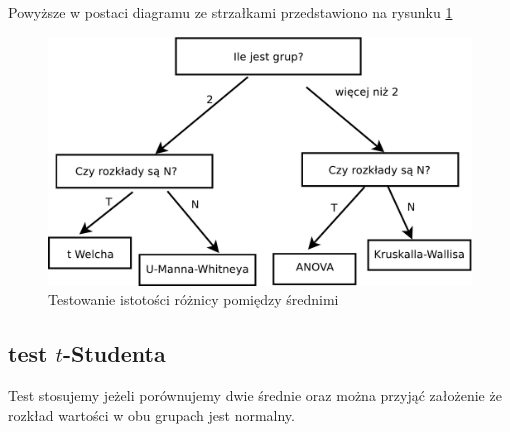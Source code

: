 \documentclass[
  openany]{book}
\begin{document}
Powyższe w postaci diagramu ze strzałkami przedstawiono na rysunku \ref{fig:testy}

\begin{figure}
\includegraphics[width=0.75\linewidth]{./TestFlowChart} \caption{Testowanie istotości różnicy pomiędzy średnimi}\label{fig:testy}
\end{figure}

\hypertarget{test-t-studenta}{%
\subsection{\texorpdfstring{test \(t\)-Studenta}{test t-Studenta}}\label{test-t-studenta}}

Test stosujemy jeżeli porównujemy dwie średnie oraz można przyjąć
założenie że rozkład wartości w obu grupach jest normalny.
\end{document}
